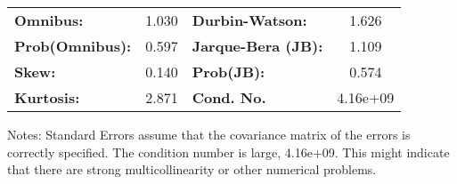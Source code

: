 \begin{center}
\begin{tabular}{lcccccc}
\bottomrule
\end{tabular}
\begin{tabular}{lclc}
\textbf{Omnibus:}       &  1.030 & \textbf{  Durbin-Watson:     } &    1.626  \\
\textbf{Prob(Omnibus):} &  0.597 & \textbf{  Jarque-Bera (JB):  } &    1.109  \\
\textbf{Skew:}          &  0.140 & \textbf{  Prob(JB):          } &    0.574  \\
\textbf{Kurtosis:}      &  2.871 & \textbf{  Cond. No.          } & 4.16e+09  \\
\bottomrule
\end{tabular}
\end{center}

Notes: \newline
 [1] Standard Errors assume that the covariance matrix of the errors is correctly specified. \newline
 [2] The condition number is large, 4.16e+09. This might indicate that there are \newline
 strong multicollinearity or other numerical problems.